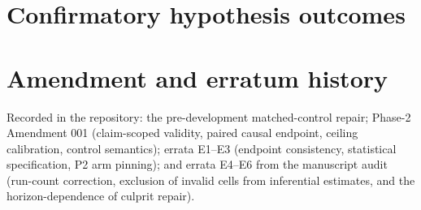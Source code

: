\documentclass[11pt]{article}
\begin{document}
\section{Confirmatory hypothesis outcomes}
\begin{table}[h]\centering\scriptsize

\caption{Preregistered hypotheses. Statistical support is not the same as
substantive adequacy; see \S\ref{sec:b001}.}
\end{table}

\section{Amendment and erratum history}
Recorded in the repository: the pre-development matched-control repair;
Phase-2 Amendment 001 (claim-scoped validity, paired causal endpoint, ceiling
calibration, control semantics); errata E1--E3 (endpoint consistency, statistical
specification, P2 arm pinning); and errata E4--E6 from the manuscript audit
(run-count correction, exclusion of invalid cells from inferential estimates, and
the horizon-dependence of culprit repair).
\end{document}
